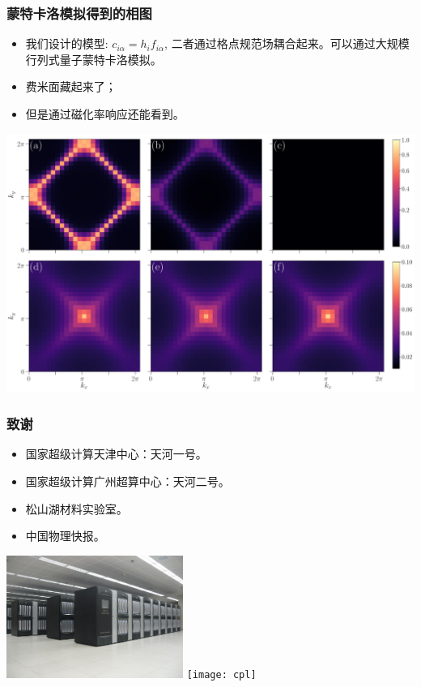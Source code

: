 \documentclass[xcolor=table, 10pt, aspectratio=169]{beamer}
\begin{document}
\begin{frame}
\frametitle{蒙特卡洛模拟得到的相图}
\begin{itemize}
\item 我们设计的模型: $c_{i\alpha} = h_i f_{i\alpha}$, 二者通过格点规范场耦合起来。可以通过大规模行列式量子蒙特卡洛模拟。
\item 费米面藏起来了；
\item 但是通过磁化率响应还能看到。
\end{itemize}
\begin{center}
	\includegraphics[width=.6\textwidth]{fig2}
\end{center}
\end{frame}

\begin{frame}
	\frametitle{致谢}
	\begin{itemize}
		\item 国家超级计算天津中心：天河一号。
		\item 国家超级计算广州超算中心：天河二号。
		\item 松山湖材料实验室。
		\item 中国物理快报。
	\end{itemize}
	\begin{center}
		\includegraphics[height=4cm]{../resources/tianhe}
		\hspace{4em}
		\texttt{[image: cpl]}
	\end{center}
\end{frame}
\end{document}
